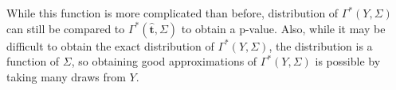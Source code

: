 \documentclass{article}
\newcommand{\vmat}{\Sigma}
\newcommand{\tst}{\hat{\boldsymbol{t}}}
\newcommand{\rvt}{Y}
\begin{document}
While this function is more complicated than before, distribution of $\Gamma^*(\rvt, \Sigma)$ can still be compared to $\Gamma^*(\tst, \Sigma)$ to obtain a p-value. Also, while it may be difficult to obtain the exact distribution of $\Gamma^*(\rvt, \Sigma)$, the distribution is a function of $\vmat$, so obtaining good approximations of $\Gamma^*(\rvt, \Sigma)$ is possible by taking many draws from $\rvt$.



\end{document}
